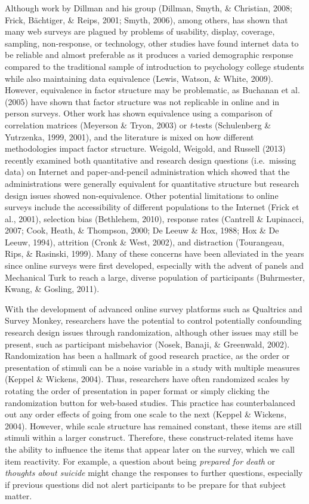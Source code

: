 \documentclass[english,man, mask]{apa6}
\theoremstyle{definition}
\theoremstyle{definition}
\theoremstyle{definition}
\theoremstyle{remark}
\begin{document}
Although work by Dillman and his group (Dillman, Smyth, \& Christian,
2008; Frick, Bächtiger, \& Reips, 2001; Smyth, 2006), among others, has
shown that many web surveys are plagued by problems of usability,
display, coverage, sampling, non-response, or technology, other studies
have found internet data to be reliable and almost preferable as it
produces a varied demographic response compared to the traditional
sample of introduction to psychology college students while also
maintaining data equivalence (Lewis, Watson, \& White, 2009). However,
equivalence in factor structure may be problematic, as Buchanan et al.
(2005) have shown that factor structure was not replicable in online and
in person surveys. Other work has shown equivalence using a comparison
of correlation matrices (Meyerson \& Tryon, 2003) or \emph{t}-tests
(Schulenberg \& Yutrzenka, 1999, 2001), and the literature is mixed on
how different methodologies impact factor structure. Weigold, Weigold,
and Russell (2013) recently examined both quantitative and research
design questions (i.e.~missing data) on Internet and paper-and-pencil
administration which showed that the administrations were generally
equivalent for quantitative structure but research design issues showed
non-equivalence. Other potential limitations to online surveys include
the accessibility of different populations to the Internet (Frick et
al., 2001), selection bias (Bethlehem, 2010), response rates (Cantrell
\& Lupinacci, 2007; Cook, Heath, \& Thompson, 2000; De Leeuw \& Hox,
1988; Hox \& De Leeuw, 1994), attrition (Cronk \& West, 2002), and
distraction (Tourangeau, Rips, \& Rasinski, 1999). Many of these
concerns have been alleviated in the years since online surveys were
first developed, especially with the advent of panels and Mechanical
Turk to reach a large, diverse population of participants (Buhrmester,
Kwang, \& Gosling, 2011).

With the development of advanced online survey platforms such as
Qualtrics and Survey Monkey, researchers have the potential to control
potentially confounding research design issues through randomization,
although other issues may still be present, such as participant
misbehavior (Nosek, Banaji, \& Greenwald, 2002). Randomization has been
a hallmark of good research practice, as the order or presentation of
stimuli can be a noise variable in a study with multiple measures
(Keppel \& Wickens, 2004). Thus, researchers have often randomized
scales by rotating the order of presentation in paper format or simply
clicking the randomization button for web-based studies. This practice
has counterbalanced out any order effects of going from one scale to the
next (Keppel \& Wickens, 2004). However, while scale structure has
remained constant, these items are still stimuli within a larger
construct. Therefore, these construct-related items have the ability to
influence the items that appear later on the survey, which we call item
reactivity. For example, a question about being \emph{prepared for
death} or \emph{thoughts about suicide} might change the responses to
further questions, especially if previous questions did not alert
participants to be prepare for that subject matter.
\end{document}
